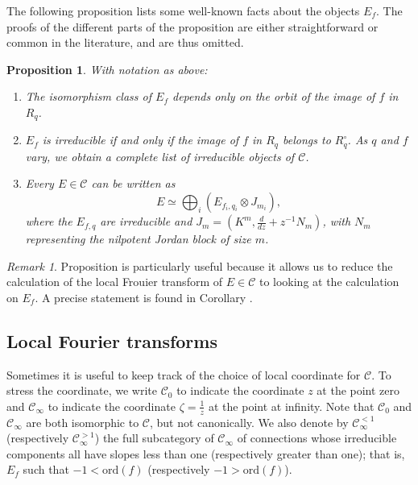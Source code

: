 \documentclass[11pt]{amsart}
\theoremstyle{theorem}
\theoremstyle{lemma}
\theoremstyle{corollary}
\theoremstyle{proposition}
\newtheorem{proposition}[theorem]{Proposition}
\theoremstyle{definition}
\theoremstyle{remark}
\newtheorem*{remark}{Remark}
\begin{document}
The following proposition lists some well-known facts about the objects $E_f$.  The proofs of the different parts of the proposition are either straightforward or common in the literature, and are thus omitted.

\begin{proposition}\label{prop} With notation as above:
\begin{enumerate}
\item \label{prop1} The isomorphism class of $E_f$ depends only on the orbit of the image of $f$ in $R_q$.
\item \label{prop2} $E_f$ is irreducible if and only if the image of $f$ in $R_q$ belongs to $R^\circ_q$. As $q$ and $f$ vary,
we obtain a complete list of irreducible objects of $\mathcal{C}$.
\item \label{prop3}Every $E\in\mathcal{C}$ can be written as
\[E\simeq\bigoplus_i(E_{f_i,q_i}\otimes J_{m_i}),\]
where the $E_{f,q}$ are irreducible and $J_m=(K^m,\frac{d}{dz}+z^{-1}N_m)$, with $N_m$ representing the nilpotent Jordan block of size $m$.
\end{enumerate}
\end{proposition}

\begin{remark}
Proposition \label{prop} \label{prop3} is particularly useful because it allows us to reduce the calculation of the local Frouier transform of $E\in\mathcal{C}$ to looking at the calculation on $E_f$.  A precise statement is found in Corollary \label{corollary}.
\end{remark}

\subsection{Local Fourier transforms}


 Sometimes it is useful to keep track of the choice of local coordinate for $\mathcal{C}$.  To stress the coordinate, we write $\mathcal{C}_0$ to indicate the coordinate $z$ at the point zero and $\mathcal{C}_{\infty}$ to indicate the coordinate $\zeta=\frac{1}{z}$ at the point at infinity.  Note that $\mathcal{C}_0$ and $\mathcal{C}_{\infty}$ are both isomorphic to $\mathcal{C}$, but not canonically.  We also denote by  $\mathcal{C}_{\infty}^{<1}$ (respectively $\mathcal{C}_{\infty}^{>1}$) the full subcategory of $\mathcal{C}_{\infty}$ of connections whose irreducible components all have slopes less than one (respectively greater than one); that is, $E_f$ such that $-1< \text{ord}(f)$ (respectively $-1>\text{ord}(f)$).
\end{document}
